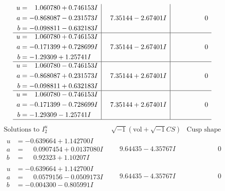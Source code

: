 \documentclass[1p]{elsarticle_modified}
\theoremstyle{definition}
\newcommand{\I}{\sqrt{-1}}
\begin{document}
$$\begin{array}{c|c|c}
\begin{aligned}
u &= \phantom{-}1.060780 + 0.746153 I \\
a &= -0.868087 - 0.231573 I \\
b &= -0.098811 - 0.632183 I\end{aligned}
 & \phantom{-}7.35144 - 2.67401 I & \phantom{-0.000000 } 0 \\ \hline\begin{aligned}
u &= \phantom{-}1.060780 + 0.746153 I \\
a &= -0.171399 + 0.728699 I \\
b &= -1.29309 + 1.25741 I\end{aligned}
 & \phantom{-}7.35144 - 2.67401 I & \phantom{-0.000000 } 0 \\ \hline\begin{aligned}
u &= \phantom{-}1.060780 - 0.746153 I \\
a &= -0.868087 + 0.231573 I \\
b &= -0.098811 + 0.632183 I\end{aligned}
 & \phantom{-}7.35144 + 2.67401 I & \phantom{-0.000000 } 0 \\ \hline\begin{aligned}
u &= \phantom{-}1.060780 - 0.746153 I \\
a &= -0.171399 - 0.728699 I \\
b &= -1.29309 - 1.25741 I\end{aligned}
 & \phantom{-}7.35144 + 2.67401 I & \phantom{-0.000000 } 0\\
 \hline 
 \end{array}$$\newpage$$\begin{array}{c|c|c}  
\text{Solutions to }I^u_{2}& \I (\text{vol} + \sqrt{-1}CS) & \text{Cusp shape}\\
 \hline 
\begin{aligned}
u &= -0.639664 + 1.142700 I \\
a &= \phantom{-}0.0907454 + 0.0137080 I \\
b &= \phantom{-}0.92323 + 1.10207 I\end{aligned}
 & \phantom{-}9.64435 - 4.35767 I & \phantom{-0.000000 } 0 \\ \hline\begin{aligned}
u &= -0.639664 + 1.142700 I \\
a &= \phantom{-}0.0579156 - 0.0509173 I \\
b &= -0.004300 - 0.805991 I\end{aligned}
 & \phantom{-}9.64435 - 4.35767 I & \phantom{-0.000000 } 0 \\ \hline\begin{aligned}

\end{aligned}
\end{array}$$
\end{document}
